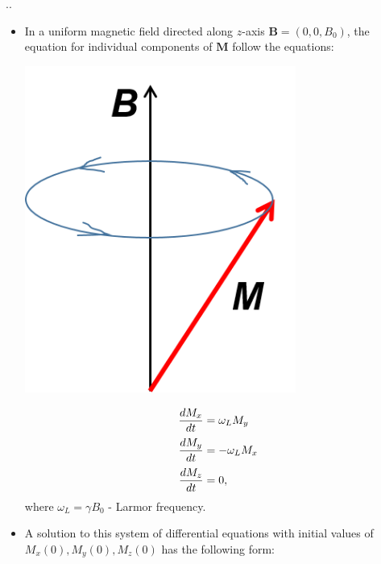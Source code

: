\documentclass{beamer}
\begin{document}
\begin{frame}{\thesection.\thesubsection. \insertsubsection}
	\begin{itemize}[<+>]
		\item 
		    In a uniform magnetic field directed along $z$-axis $\bm{B} = (0, 0, B_0)$, the equation for individual components of $\bm{M}$ follow the equations:
		    
		    \begin{minipage}[b][4cm]{0.4\textwidth}
		    	\centering
		    	\includegraphics[width=0.7\textwidth]{precession.png}
		    \end{minipage}
		    \hspace{0.1cm}		    
		    \begin{minipage}[b][4cm]{0.4\textwidth}
		        \centering
		    	 \begin{equation} \label{precession}
		    	 \setlength{\jot}{5pt}
		    	 \begin{aligned}
		    	 \dfrac{dM_x}{dt} & =  \omega_L M_y \\
		    	 \dfrac{dM_y}{dt} & =  -\omega_L M_x \\
		    	 \dfrac{dM_z}{dt} & =  0,
		    	 \end{aligned}
		    	 \end{equation}
		    	 where $\omega_L = \gamma B_0$ - \alert{Larmor frequency}.
		    \end{minipage}
		    
		    
		\item
			A solution to this system of differential equations with initial values of $M_x(0), M_y(0), M_z(0)$ has the following form:
						

\end{itemize}
\end{frame}
\end{document}
